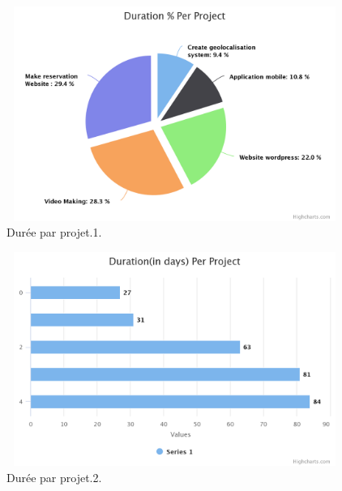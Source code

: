 \FloatBarrier
\begin{figure}[H]
\center
\includegraphics[width=11cm,height=7cm]{./figures/pres/duration-per-project.png}
\caption{Dur\'{e}e par projet.1. }
\end{figure}
\FloatBarrier

\FloatBarrier
\begin{figure}[H]
\center
\includegraphics[width=11cm,height=7cm]{./figures/pres/durationin-days-per-proj.png}
\caption{Dur\'{e}e par projet.2.}
\end{figure}
\FloatBarrier









